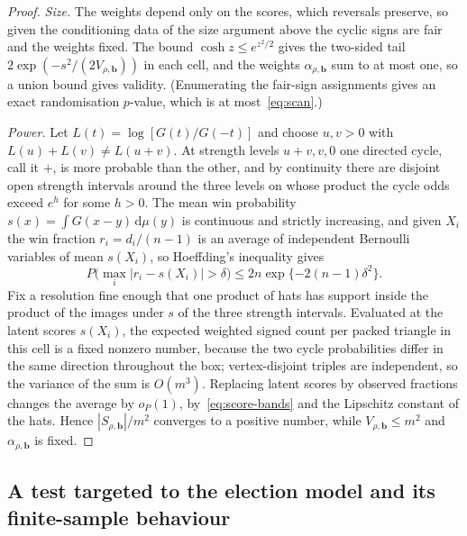 \documentclass[11pt,a4paper]{article}
\theoremstyle{definition}
\newcommand{\dd}{\mathrm d}
\begin{document}
\begin{proof}
\emph{Size.} The weights depend only on the scores, which reversals preserve, so given the conditioning data of the size argument above the cyclic signs are fair and the weights fixed. The bound $\cosh z\le e^{z^2/2}$ gives the two-sided tail $2\exp(-s^2/(2V_{\rho,\mathbf b}))$ in each cell, and the weights $\alpha_{\rho,\mathbf b}$ sum to at most one, so a union bound gives validity. (Enumerating the fair-sign assignments gives an exact randomisation $p$-value, which is at most~\eqref{eq:scan}.)

\emph{Power.} Let $L(t)=\log[G(t)/G(-t)]$ and choose $u,v>0$ with $L(u)+L(v)\ne L(u+v)$. At strength levels $u+v,v,0$ one directed cycle, call it $+$, is more probable than the other, and by continuity there are disjoint open strength intervals around the three levels on whose product the cycle odds exceed $e^h$ for some $h>0$. The mean win probability $s(x)=\int G(x-y)\,\dd\mu(y)$ is continuous and strictly increasing, and given $X_i$ the win fraction $r_i=d_i/(n-1)$ is an average of independent Bernoulli variables of mean $s(X_i)$, so Hoeffding's inequality gives
\begin{equation}\label{eq:score-bands}
 P\Big(\max_i|r_i-s(X_i)|>\delta\Big)\le 2n\exp\{-2(n-1)\delta^2\}.
\end{equation}
Fix a resolution fine enough that one product of hats has support inside the product of the images under $s$ of the three strength intervals. Evaluated at the latent scores $s(X_i)$, the expected weighted signed count per packed triangle in this cell is a fixed nonzero number, because the two cycle probabilities differ in the same direction throughout the box; vertex-disjoint triples are independent, so the variance of the sum is $O(m^3)$. Replacing latent scores by observed fractions changes the average by $o_P(1)$, by~\eqref{eq:score-bands} and the Lipschitz constant of the hats. Hence $|S_{\rho,\mathbf b}|/m^2$ converges to a positive number, while $V_{\rho,\mathbf b}\le m^2$ and $\alpha_{\rho,\mathbf b}$ is fixed.
\end{proof}

\subsection{A test targeted to the election model and its finite-sample behaviour}\label{sec:targeted}
\end{document}
